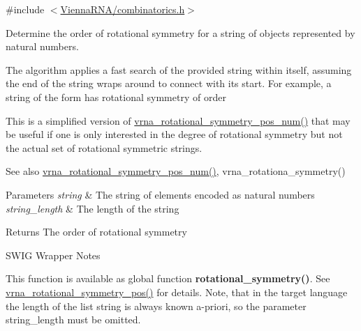 {\ttfamily \#include $<$\mbox{\hyperlink{combinatorics_8h}{Vienna\+R\+N\+A/combinatorics.\+h}}$>$}



Determine the order of rotational symmetry for a string of objects represented by natural numbers. 

The algorithm applies a fast search of the provided string within itself, assuming the end of the string wraps around to connect with it\textquotesingle{}s start. For example, a string of the form {} has rotational symmetry of order {} 

This is a simplified version of \mbox{\hyperlink{group__combinatorics__utils_ga95b5a6ac35da982e2a766f8d2f98a2e1}{vrna\+\_\+rotational\+\_\+symmetry\+\_\+pos\+\_\+num()}} that may be useful if one is only interested in the degree of rotational symmetry but not the actual set of rotational symmetric strings.

\begin{DoxySeeAlso}{See also}
\mbox{\hyperlink{group__combinatorics__utils_ga95b5a6ac35da982e2a766f8d2f98a2e1}{vrna\+\_\+rotational\+\_\+symmetry\+\_\+pos\+\_\+num()}}, vrna\+\_\+rotationa\+\_\+symmetry()
\end{DoxySeeAlso}

\begin{DoxyParams}{Parameters}
{\em string} & The string of elements encoded as natural numbers \\
\hline
{\em string\+\_\+length} & The length of the string \\
\hline
\end{DoxyParams}
\begin{DoxyReturn}{Returns}
The order of rotational symmetry
\end{DoxyReturn}
\begin{DoxyRefDesc}{S\+W\+I\+G Wrapper Notes}
\item[\mbox{\hyperlink{wrappers__wrappers000016}{S\+W\+I\+G Wrapper Notes}}]This function is available as global function {\bfseries{rotational\+\_\+symmetry()}}. See \mbox{\hyperlink{group__combinatorics__utils_ga294d48935fcac87ab335d771fe289ecb}{vrna\+\_\+rotational\+\_\+symmetry\+\_\+pos()}} for details. Note, that in the target language the length of the list {\ttfamily string} is always known a-\/priori, so the parameter {\ttfamily string\+\_\+length} must be omitted. \end{DoxyRefDesc}
\mbox{\label{group__combinatorics__utils_ga95b5a6ac35da982e2a766f8d2f98a2e1}} 
